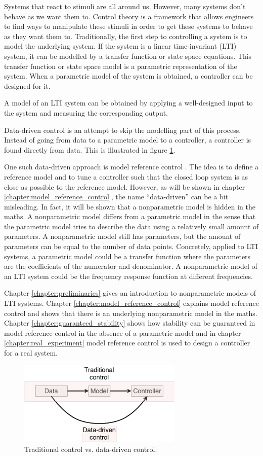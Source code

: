 

Systems that react to stimuli are all around us. However, many systems don't behave as we want them to. Control theory is a framework that allows engineers to find ways to manipulate these stimuli in order to get these systems to behave as they want them to. Traditionally, the first step to controlling a system is to model the underlying system. If the system is a linear time-invariant (LTI) system, it can be modelled by a transfer function or state space equations. This transfer function or state space model is a parametric representation of the system. When a parametric model of the system is obtained, a controller can be designed for it. 

A model of an LTI system can be obtained by applying a well-designed input to the system and measuring the corresponding output.

Data-driven control is an attempt to skip the modelling part of this process. Instead of going from data to a parametric model to a controller, a controller is found directly from data. This is illustrated in figure \ref{fig:data-driven_vs_tradition}.

One such data-driven approach is model reference control \cite{Data-driven_model_reference_control}. The idea is to define a reference model and to tune a controller such that the closed loop system is as close as possible to the reference model. However, as will be shown in chapter \ref{chapter:model_reference_control}, the name ``data-driven'' can be a bit misleading. In fact, it will be shown that a nonparametric model is hidden in the maths. A nonparametric model differs from a parametric model in the sense that the parametric model tries to describe the data using a relatively small amount of parameters. A nonparametric model still has parameters, but the amount of parameters can be equal to the number of data points. Concretely, applied to LTI systems, a parametric model could be a transfer function where the parameters are the coefficients of the numerator and denominator. A nonparametric model of an LTI system could be the frequency response function at different frequencies.

Chapter \ref{chapter:preliminaries} gives an introduction to nonparametric models of LTI systems. Chapter \ref{chapter:model_reference_control} explains model reference control and shows that there is an underlying nonparametric model in the maths. Chapter \ref{chapter:guaranteed_stability} shows how stability can be guaranteed in model reference control in the absence of a parametric model and in chapter \ref{chapter:real_experiment} model reference control is used to design a controller for a real system.


\begin{figure}
\centering
\includegraphics[width = 0.7\textwidth]{figures/data-driven_vs_tradition.pdf}
\caption{Traditional control vs. data-driven control.}
\label{fig:data-driven_vs_tradition}
\end{figure}
